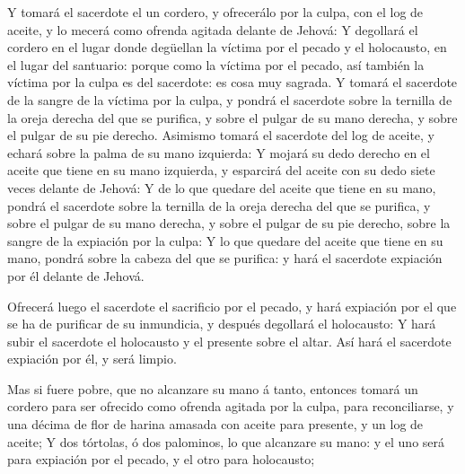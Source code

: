  Y tomará el sacerdote el un cordero, y ofrecerálo por la
culpa, con el log de aceite, y lo mecerá como ofrenda agitada delante de
Jehová:  Y degollará el cordero en el lugar donde degüellan
la víctima por el pecado y el holocausto, en el lugar del santuario:
porque como la víctima por el pecado, así también la víctima por la
culpa es del sacerdote: es cosa muy sagrada.  Y tomará el
sacerdote de la sangre de la víctima por la culpa, y pondrá el sacerdote
sobre la ternilla de la oreja derecha del que se purifica, y sobre el
pulgar de su mano derecha, y sobre el pulgar de su pie derecho.
 Asimismo tomará el sacerdote del log de aceite, y echará
sobre la palma de su mano izquierda:  Y mojará su dedo
derecho en el aceite que tiene en su mano izquierda, y esparcirá del
aceite con su dedo siete veces delante de Jehová:  Y de lo
que quedare del aceite que tiene en su mano, pondrá el sacerdote sobre
la ternilla de la oreja derecha del que se purifica, y sobre el pulgar
de su mano derecha, y sobre el pulgar de su pie derecho, sobre la sangre
de la expiación por la culpa:  Y lo que quedare del aceite
que tiene en su mano, pondrá sobre la cabeza del que se purifica: y hará
el sacerdote expiación por él delante de Jehová.

 Ofrecerá luego el sacerdote el sacrificio por el pecado, y
hará expiación por el que se ha de purificar de su inmundicia, y después
degollará el holocausto:  Y hará subir el sacerdote el
holocausto y el presente sobre el altar. Así hará el sacerdote expiación
por él, y será limpio.

 Mas si fuere pobre, que no alcanzare su mano á tanto,
entonces tomará un cordero para ser ofrecido como ofrenda agitada por la
culpa, para reconciliarse, y una décima de flor de harina amasada con
aceite para presente, y un log de aceite;  Y dos tórtolas,
ó dos palominos, lo que alcanzare su mano: y el uno será para expiación
por el pecado, y el otro para holocausto;

